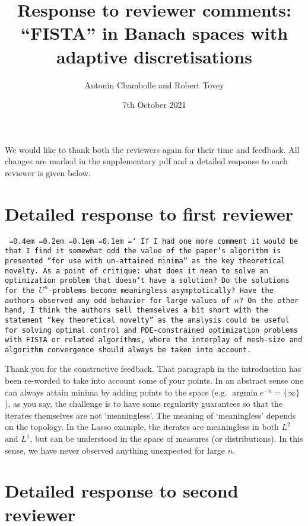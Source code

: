 \documentclass[12pt]{article}
\title{Response to reviewer comments:\\``FISTA'' in Banach spaces with adaptive discretisations}
\author{Antonin Chambolle and Robert Tovey}
\date{7th October 2021}
\newcommand*\justify{%
	\fontdimen2\font=0.4em%
	\fontdimen3\font=0.2em%
	\fontdimen4\font=0.1em%
	\fontdimen7\font=0.1em%
	\hyphenchar\font=`\-%
}
\newcommand{\review}[1]{\texttt{\justify{#1}}}
\begin{document}
\maketitle

We would like to thank both the reviewers again for their time and feedback. All changes are marked in the supplementary pdf and a detailed response to each reviewer is given below.


\section{Detailed response to first reviewer}
\review{If I had one more comment it would be that I find it somewhat odd the value of the paper's algorithm is presented ``for use with un-attained minima'' as the key theoretical novelty. As a point of critique: what does it mean to solve an optimization problem that doesn't have a solution? Do the solutions for the $U^n$-problems become meaningless asymptotically? Have the authors observed any odd behavior for large values of $n$? On the other hand, I think the authors sell themselves a bit short with the statement ``key theoretical novelty'' as the analysis could be useful for solving optimal control and PDE-constrained optimization problems with FISTA or related algorithms, where the interplay of mesh-size and algorithm convergence should always be taken into account.}

Thank you for the constructive feedback. That paragraph in the introduction has been re-worded to take into account some of your points. In an abstract sense one can always attain minima by adding points to the space (e.g. $\operatorname{argmin} e^{-u} = \{\infty\}$), as you say, the challenge is to have some regularity guarantees so that the iterates themselves are not `meaningless'. The meaning of `meaningless' depends on the topology. In the Lasso example, the iterates are meaningless in both $L^2$ and $L^1$, but can be understood in the space of measures (or distributions). In this sense, we have never observed anything unexpected for large $n$. 

\section{Detailed response to second reviewer}
\end{document}
